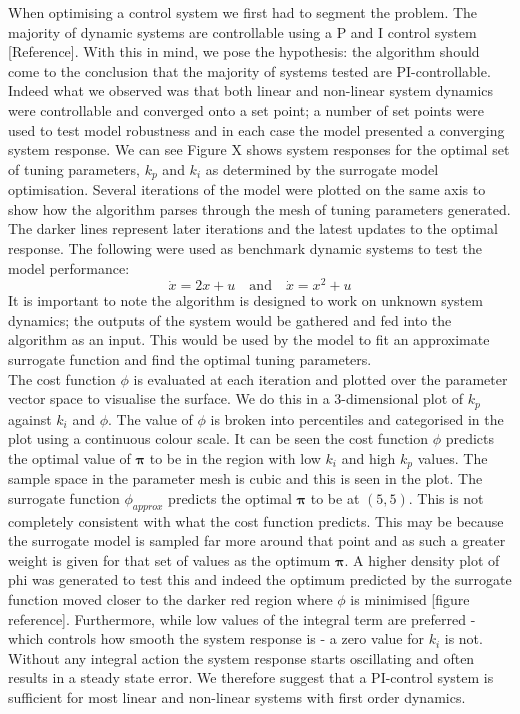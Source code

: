 \documentclass[conference]{IEEEtran}
\theoremstyle{definition}
\begin{document}
When optimising a control system we first had to segment the problem. The majority of dynamic systems are controllable using a P and I control system [Reference]. With this in mind, we pose the hypothesis: the algorithm should come to the conclusion that the majority of systems tested are PI-controllable. Indeed what we observed was that both linear and non-linear system dynamics were controllable and converged onto a set point; a number of set points were used to test model robustness and in each case the model presented a converging system response. We can see Figure X shows system responses for the optimal set of tuning parameters, $k_p$ and $k_i$  as determined by the surrogate model optimisation. Several iterations of the model were plotted on the same axis to show how the algorithm parses through the mesh of tuning parameters generated. The darker lines represent later iterations and the latest updates to the optimal response. The following were used as benchmark dynamic systems to test the model performance:
\begin{equation}
\dot{x} = 2x +u \quad \textrm{and} \quad \dot{x} = x^2 + u
\end{equation}
It is important to note the algorithm is designed to work on unknown system dynamics; the outputs of the system would be gathered and fed into the algorithm as an input. This would be used by the model to fit an approximate surrogate function and find the optimal tuning parameters.\\
The cost function $\phi$ is evaluated at each iteration and plotted over the parameter vector space to visualise the surface. We do this in a 3-dimensional plot of $k_p$ against $k_i$ and $\phi$. The value of $\phi$ is broken into percentiles and categorised in the plot using a continuous colour scale. It can be seen the cost function $\phi$ predicts the optimal value of $\boldsymbol \pi$ to be in the region with low $k_i$ and high $k_p$ values. The sample space in the parameter mesh is cubic and this is seen in the plot. The surrogate function $\phi_{approx}$ predicts the optimal $\boldsymbol \pi$ to be at $(5,5)$. This is not completely consistent with what the cost function predicts. This may be because the surrogate model is sampled far more around that point and as such a greater weight is given for that set of values as the optimum $\boldsymbol \pi$. A higher density plot of phi was generated to test this and indeed the optimum predicted by the surrogate function moved closer to the darker red region where $\phi$ is minimised [figure reference].
Furthermore, while low values of the integral term are preferred - which controls how smooth the system response is - a zero value for $k_i$ is not. Without any integral action the system response starts oscillating and often results in a steady state error. We therefore suggest that a PI-control system is sufficient for most linear and non-linear systems with first order dynamics. 
\end{document}

